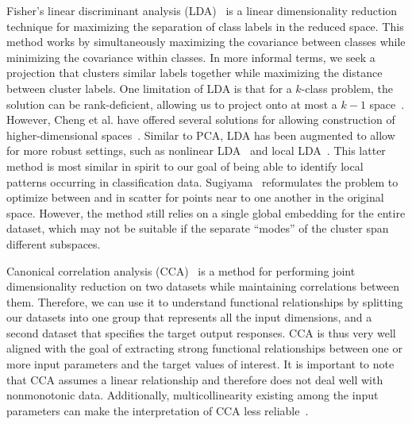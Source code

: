 Fisher's linear discriminant analysis (LDA)~\cite{Fisher1936} is a linear dimensionality reduction technique for maximizing the separation of class labels in the reduced space.
%
This method works by simultaneously maximizing the covariance between classes while minimizing the covariance within classes.
%
In more informal terms, we seek a projection that clusters similar labels together while maximizing the distance between cluster labels.
%
One limitation of LDA is that for a $k$-class problem, the solution can be rank-deficient, allowing us to project onto at most a $k-1$ space~\cite{MaszczykDuch2008}.
%
However, Cheng et al. have offered several solutions for allowing construction of higher-dimensional spaces~\cite{ChengZhuangYang1992}.
%
Similar to PCA, LDA has been augmented to allow for more robust settings, such as nonlinear LDA~\cite{MikaRatschWeston1999,McLachlan2004} and local LDA~\cite{Sugiyama2006}.
%
This latter method is most similar in spirit to our goal of being able to identify local patterns occurring in classification data.
%
Sugiyama~\cite{Sugiyama2006} reformulates the problem to optimize between and in scatter for points near to one another in the original space.
%
However, the method still relies on a single global embedding for the entire dataset, which may not be suitable if the separate ``modes'' of the cluster span different subspaces.

Canonical correlation analysis (CCA)~\cite{Hotelling1935,HardoonSzedmakShawe-Taylor2004} is a method for performing joint dimensionality reduction on two datasets while maintaining correlations between them.
%
Therefore, we can use it to understand functional relationships by splitting our datasets into one group that represents all the input dimensions, and a second dataset that specifies the target output responses.
%
CCA is thus very well aligned with the goal of extracting strong functional relationships between one or more input parameters and the target values of interest.
%
It is important to note that CCA assumes a linear relationship and therefore does not deal well with nonmonotonic data.
%
Additionally, multicollinearity existing among the input parameters can make the interpretation of CCA less reliable~\cite{HairAndersonTatham1998}.

